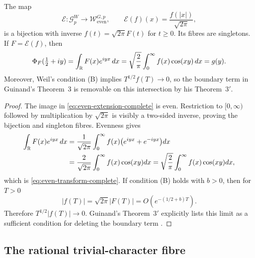 \begin{theorem}
\label{thm:guinand-weil-even-complete}
The map
\begin{equation}
 \mathcal E:\mathcal G_p^W\longrightarrow
 \mathcal W_{\mathrm{even}}^{G,p},\qquad
 \mathcal E(f)(x)=\frac{f(|x|)}{\sqrt{2\pi}},
 \label{eq:even-extension-complete}
\end{equation}
is a bijection with inverse
$f(t)=\sqrt{2\pi}F(t)$ for $t\geq0$.  Its fibres are singletons.  If
$F=\mathcal E(f)$, then
\begin{equation}
 \Phi_F(\tfrac12+iy)
 =\int_\mathbb R F(x)e^{iyx}\,dx
 =\sqrt{\frac2\pi}\int_0^\infty f(x)\cos(xy)\,dx
 =g(y).
 \label{eq:even-transform-complete}
\end{equation}
Moreover, Weil's condition (B) implies
$T^{1/2}f(T)\to0$, so the boundary term in Guinand's Theorem~3 is removable
on this intersection by his Theorem~$3'$.
\end{theorem}

\begin{proof}
The image in \eqref{eq:even-extension-complete} is even.  Restriction to
$[0,\infty)$ followed by multiplication by $\sqrt{2\pi}$ is visibly a
two-sided inverse, proving the bijection and singleton fibres.  Evenness gives
\begin{align*}
 \int_\mathbb R F(x)e^{iyx}\,dx
 &=\frac1{\sqrt{2\pi}}\int_0^\infty
 f(x)\bigl(e^{iyx}+e^{-iyx}\bigr)dx\\
 &=\frac2{\sqrt{2\pi}}\int_0^\infty f(x)\cos(xy)dx
 =\sqrt{\frac2\pi}\int_0^\infty f(x)\cos(xy)dx,
\end{align*}
which is \eqref{eq:even-transform-complete}.  If condition (B) holds with
$b>0$, then for $T>0$
\[
 |f(T)|=\sqrt{2\pi}|F(T)|
 =O\!\left(e^{-(1/2+b)T}\right).
\]
Therefore $T^{1/2}|f(T)|\to0$.  Guinand's Theorem~$3'$ explicitly lists this
limit as a sufficient condition for deleting the boundary term
\cite[pp.~112--115, Thms.~3 and~$3'$]{guinand1948}.
\end{proof}

\subsection{The rational trivial-character fibre}

